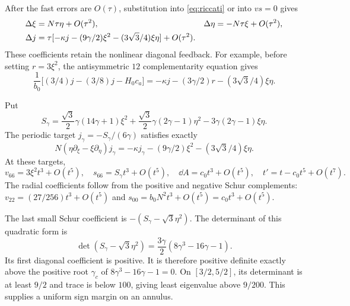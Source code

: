 \documentclass[11pt]{article}
\theoremstyle{remark}\newtheorem{remark}[theorem]{Remark}
\numberwithin{equation}{section}
\begin{document}
After the fast errors are $O(\tau)$, substitution into \eqref{eq:riccati} or into $vs=0$ gives
\begin{align}\label{eq:phasefilter}
 \Delta\xi&=N\tau\eta+O(\tau^2),&\Delta\eta&=-N\tau\xi+O(\tau^2),\\
 \Delta j&=\tau[-\kappa j-(9\gamma/2)\xi^2-(3\sqrt3/4)\xi\eta]+O(\tau^2).\notag
\end{align}
These coefficients retain the nonlinear diagonal feedback. For example, before setting $r=3\xi^2$, the antisymmetric $12$ complementarity equation gives
\[
 \frac1{b_0}\bigl[(3/4)j-(3/8)j-H_0c_a\bigr]
 =-\kappa j-(3\gamma/2)r-(3\sqrt3/4)\xi\eta.
\]

Put
\begin{equation}\label{eq:Sgamma}
 S_\gamma=\frac{\sqrt3}2\gamma(14\gamma+1)\xi^2
 +\frac{\sqrt3}2\gamma(2\gamma-1)\eta^2
 -3\gamma(2\gamma-1)\xi\eta.
\end{equation}
The periodic target $j_\gamma=-S_\gamma/(6\gamma)$ satisfies exactly
\[
 N(\eta\partial_\xi-\xi\partial_\eta)j_\gamma
 =-\kappa j_\gamma-(9\gamma/2)\xi^2-(3\sqrt3/4)\xi\eta.
\]
At these targets,
\begin{equation}\label{eq:radialamplitudecoeff}
 v_{66}=3\xi^2t^3+O(t^5),\quad s_{66}=S_\gamma t^3+O(t^5),
 \quad\dd A=c_0t^3+O(t^5),\quad t'=t-c_0t^5+O(t^7).
\end{equation}
The radial coefficients follow from the positive and negative Schur complements: $v_{22}=(27/256)t^3+O(t^5)$ and $s_{00}=b_0N^2t^3+O(t^5)=c_0t^3+O(t^5)$.

The last small Schur coefficient is $-(S_\gamma-\sqrt3\eta^2)$. The determinant of this quadratic form is
\begin{equation}\label{eq:sign}
 \det(S_\gamma-\sqrt3\eta^2)=\frac{3\gamma}{2}(8\gamma^3-16\gamma-1).
\end{equation}
Its first diagonal coefficient is positive. It is therefore positive definite exactly above the positive root $\gamma_c$ of $8\gamma^3-16\gamma-1=0$. On $[3/2,5/2]$, its determinant is at least $9/2$ and trace is below $100$, giving least eigenvalue above $9/200$. This supplies a uniform sign margin on an annulus.
\end{document}
